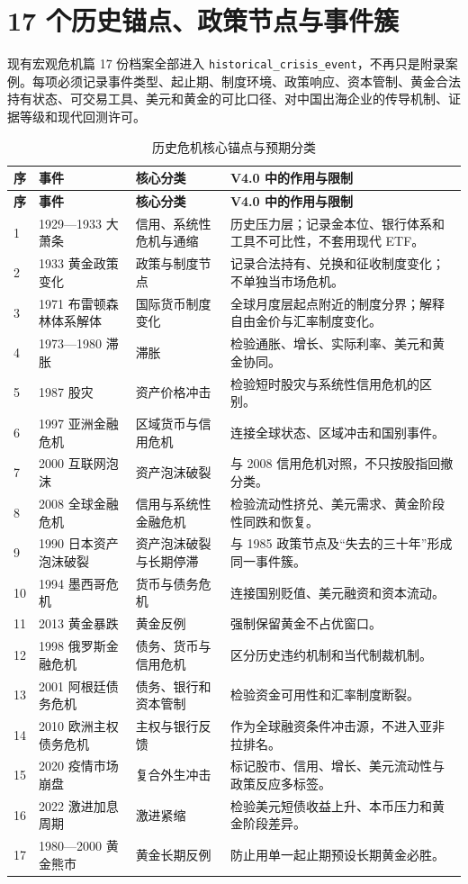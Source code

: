 \documentclass[UTF8,fontset=windows,12pt,openany]{ctexbook}
\newcommand{\Field}[1]{{\small\nolinkurl{#1}}}
\begin{document}
\section{17 个历史锚点、政策节点与事件簇}

现有宏观危机篇 17 份档案全部进入 \Field{historical_crisis_event}，不再只是附录案例。每项必须记录事件类型、起止期、制度环境、政策响应、资本管制、黄金合法持有状态、可交易工具、美元和黄金的可比口径、对中国出海企业的传导机制、证据等级和现代回测许可。

\begin{longtable}{p{1.0cm}p{3.3cm}p{3.1cm}p{6.0cm}}
\caption{历史危机核心锚点与预期分类}\label{tab:historical-anchors}\\
\toprule
\textbf{序} & \textbf{事件} & \textbf{核心分类} & \textbf{V4.0 中的作用与限制}\\
\midrule
\endfirsthead
\toprule \textbf{序} & \textbf{事件} & \textbf{核心分类} & \textbf{V4.0 中的作用与限制}\\ \midrule
\endhead
1 & 1929—1933 大萧条 & 信用、系统性危机与通缩 & 历史压力层；记录金本位、银行体系和工具不可比性，不套用现代 ETF。\\
2 & 1933 黄金政策变化 & 政策与制度节点 & 记录合法持有、兑换和征收制度变化；不单独当市场危机。\\
3 & 1971 布雷顿森林体系解体 & 国际货币制度变化 & 全球月度层起点附近的制度分界；解释自由金价与汇率制度变化。\\
4 & 1973—1980 滞胀 & 滞胀 & 检验通胀、增长、实际利率、美元和黄金协同。\\
5 & 1987 股灾 & 资产价格冲击 & 检验短时股灾与系统性信用危机的区别。\\
6 & 1997 亚洲金融危机 & 区域货币与信用危机 & 连接全球状态、区域冲击和国别事件。\\
7 & 2000 互联网泡沫 & 资产泡沫破裂 & 与 2008 信用危机对照，不只按股指回撤分类。\\
8 & 2008 全球金融危机 & 信用与系统性金融危机 & 检验流动性挤兑、美元需求、黄金阶段性同跌和恢复。\\
9 & 1990 日本资产泡沫破裂 & 资产泡沫破裂与长期停滞 & 与 1985 政策节点及“失去的三十年”形成同一事件簇。\\
10 & 1994 墨西哥危机 & 货币与债务危机 & 连接国别贬值、美元融资和资本流动。\\
11 & 2013 黄金暴跌 & 黄金反例 & 强制保留黄金不占优窗口。\\
12 & 1998 俄罗斯金融危机 & 债务、货币与信用危机 & 区分历史违约机制和当代制裁机制。\\
13 & 2001 阿根廷债务危机 & 债务、银行和资本管制 & 检验资金可用性和汇率制度断裂。\\
14 & 2010 欧洲主权债务危机 & 主权与银行反馈 & 作为全球融资条件冲击源，不进入亚非拉排名。\\
15 & 2020 疫情市场崩盘 & 复合外生冲击 & 标记股市、信用、增长、美元流动性与政策反应多标签。\\
16 & 2022 激进加息周期 & 激进紧缩 & 检验美元短债收益上升、本币压力和黄金阶段差异。\\
17 & 1980—2000 黄金熊市 & 黄金长期反例 & 防止用单一起止期预设长期黄金必胜。\\
\bottomrule
\end{longtable}
\end{document}

